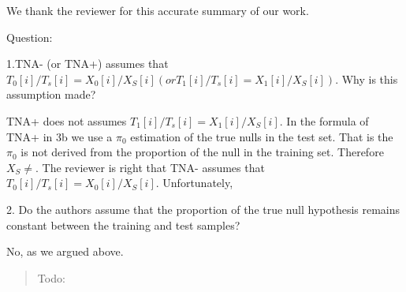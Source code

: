 \documentclass{article}
\newcommand{\response}[1]{\vspace*{1ex} \color{blue} \noindent #1 \color{black}
\vspace*{2ex}}
\newcommand{\edit}[1]{\begin{quotation}\color{red}\noindent #1
\color{black}\end{quotation}}
\begin{document}
\response{We thank the reviewer for this accurate summary of our work.}

Question:

1.TNA- (or TNA+) assumes that $T_0[i]/T_s[i]= X_0[i]/X_S[i] (or T_1[i]/T_s[i]= X_1[i]/X_S[i] )$. Why is this assumption made? 

\response{TNA+ does not assumes $T_1[i]/T_s[i]= X_1[i]/X_S[i]$. In the formula of TNA+ in 3b we use a $\pi_0$ estimation of the true nulls in the test set. That is the $\pi_0$ is not derived from the proportion of the null in the training set. Therefore $X_S \ne  $. The reviewer is right that TNA- assumes that $T_0[i]/T_s[i]= X_0[i]/X_S[i]$. Unfortunately,  }



2. Do the authors assume that the proportion of the true null hypothesis remains constant between the training and test samples?


\response{No, as we argued above.}


\edit{Todo:}



\end{document}
